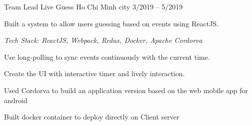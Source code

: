 \begin{cventries}
  \cventry
    {Team Lead} %
    {Live Guess} %
    {Ho Chi Minh city} %
    {3/2019 -- 5/2019} %
    {
      \begin{cvitems} %
        \item {Built a system to allow users guessing based on  events using ReactJS.}
        \item[] {\it Tech Stack: ReactJS, Webpack, Redux, Docker, Apache Cordorva}
        \item {Use long-polling to sync events continuously with the current time.}
        \item{Create the UI with interactive timer and lively interaction.}
        \item{Used Cordorva to build an application version based on the web mobile app for android}
        \item {Built docker container to deploy directly on Client server}
      \end{cvitems}
    }

\end{cventries}
